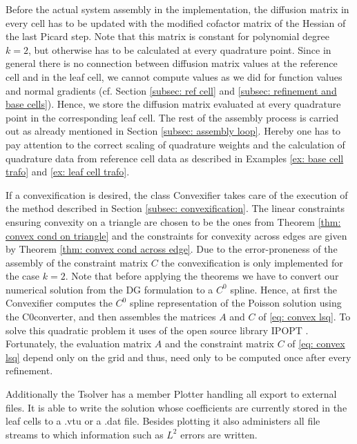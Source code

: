Before the actual system assembly in the implementation, the diffusion matrix in every cell has to be updated with the modified cofactor matrix of the Hessian of the last Picard step. Note that this matrix is constant for polynomial degree $k=2$, but otherwise has to be calculated at every quadrature point. Since in general there is no connection between diffusion matrix values at the reference cell and in the leaf cell, we cannot compute values as we did for function values and normal gradients (cf. Section \ref{subsec: ref cell} and \ref{subsec: refinement and base cells}). Hence, we store the diffusion matrix evaluated at every quadrature point in the corresponding leaf cell.
The rest of the assembly process is carried out as already mentioned in Section \ref{subsec: assembly loop}. Hereby one has to pay attention to the correct scaling of quadrature weights and the calculation of quadrature data from reference cell data as described in Examples \ref{ex: base cell trafo} and \ref{ex: leaf cell trafo}. 

If a convexification is desired, the class Convexifier takes care of the execution of the method described in Section \ref{subsec: convexification}. The linear constraints ensuring convexity on a triangle are chosen to be the ones from Theorem \ref{thm: convex cond on triangle} and the constraints for convexity across edges are given by Theorem \ref{thm: convex cond across edge}. Due to the error-proneness of the assembly of the constraint matrix $C$ the convexification is only implemented for the case $k=2$.
Note that before applying the theorems we have to convert our numerical solution from the DG formulation to a $C^0$ spline.
Hence, at first the Convexifier computes the $C^0$ spline representation of the Poisson solution using the C0converter, and then assembles the matrices $A$ and $C$ of \eqref{eq: convex lsq}. To solve this quadratic problem it uses of the open source library IPOPT \cite{ipopt}.\\
Fortunately, the evaluation matrix $A$ and the constraint matrix $C$ of \eqref{eq: convex lsq} depend only on the grid and thus, need only to be computed once after every refinement.

Additionally the Tsolver has a member Plotter handling all export to external files. It is able to write the solution whose coefficients are currently stored in the leaf cells to a .vtu or a .dat file. Besides plotting it also administers all file streams to which information such as $L^2$ errors are written.

